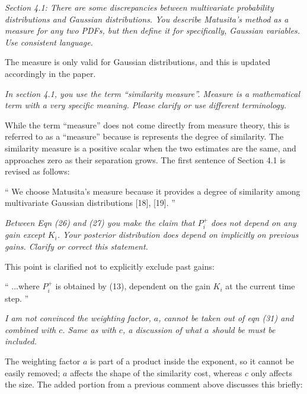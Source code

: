 \documentclass[11pt]{article}
\newenvironment{correction}{\begin{list}{}{\setlength{\leftmargin}{1cm}\setlength{\rightmargin}{1cm}}\vspace{\parsep}\item[]``}{''\end{list}}
\begin{document}
\begin{itemize}
\item {\itshape Section 4.1: There are some discrepancies between multivariate probability distributions and Gaussian distributions.  You describe Matusita's method as a measure for any two PDFs, but then define it for specifically, Gaussian variables.  Use consistent language.}

The measure is only valid for Gaussian distributions, and this is updated accordingly in the paper.

\item {\itshape In section 4.1, you use the term ``similarity measure''.  Measure is a mathematical term with a very specific meaning.  Please clarify or use different terminology.}

While the term ``measure'' does not come directly from measure theory, this is referred to as a ``measure'' because is represents the degree of similarity. The similarity measure is a positive scalar when the two estimates are the same, and approaches zero as their separation grows. The first sentence of Section 4.1 is revised as follows:

\begin{correction}
We choose Matusita's measure because it provides a degree of similarity among multivariate Gaussian distributions [18], [19]. 
\end{correction}


\item {\itshape Between Eqn (26) and (27) you make the claim that $P_i^+$ does not depend on any gain except $K_i$.  Your posterior distribution does depend on implicitly on previous gains.  Clarify or correct this statement.}

This point is clarified not to explicitly exclude past gains:

\begin{correction}
...where $P^+_i$ is obtained by (13), dependent on the gain $K_i$ at the current time step.
\end{correction}

\item {\itshape I am not convinced the weighting factor, $a$, cannot be taken out of eqn (31) and combined with $c$.  Same as with $c$, a discussion of what $a$ should be must be included.}

The weighting factor $a$ is part of a product inside the exponent, so it cannot be easily removed; $a$ affects the shape of the similarity cost, whereas $c$ only affects the size. The added portion from a previous comment above discusses this briefly:


\end{itemize}
\end{document}

